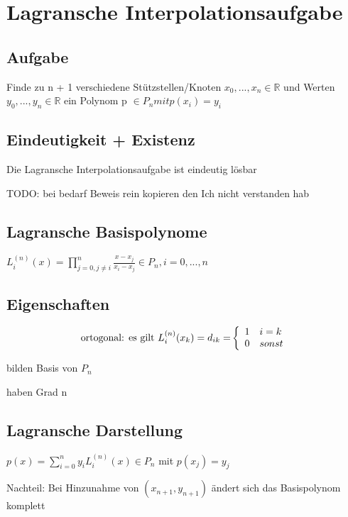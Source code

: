 \documentclass[12pt,a4paper]{article} %
\begin{document}
	\newpage
	
	\section{Lagransche Interpolationsaufgabe}
	
	\subsection{Aufgabe}
	
	Finde zu n + 1 verschiedene Stützstellen/Knoten $x_0, ..., x_n \in \mathbb{R}$ und Werten $y_0, ..., y_n \in \mathbb{R}$ ein Polynom p $\in P_n mit p(x_i) = y_i$
	
	\subsection{Eindeutigkeit + Existenz}
	
	Die Lagransche Interpolationsaufgabe ist eindeutig lösbar
	
	TODO: bei bedarf Beweis rein kopieren den Ich nicht verstanden hab
	
	\subsection{Lagransche Basispolynome}
	
	$L_i^{(n)}(x) = \prod\limits_{j = 0, j \ne i}^{n} \frac{x - x_j}{x_i - x_j} \in P_n, i = 0, ..., n$
	
	\subsection{Eigenschaften}
	
	\[
		\textnormal{ortogonal: es gilt $L_i^{(n)}(x_k) = d_{ik} =$} \left\{
			\begin{array}{ll}
				1 & i = k \\
				0 & sonst
			\end{array}
		\right.
	\]
	
	bilden Basis von $P_n$
	
	haben Grad n
	
	\subsection{Lagransche Darstellung}
	
	$p(x) = \sum\limits_{i = 0}^{n}y_iL_i^{(n)}(x) \in P_n$ mit $p(x_j) = y_j$
	
	Nachteil: Bei Hinzunahme von $(x_{n+1}, y_{n+1})$ ändert sich das Basispolynom komplett
	
\end{document}
